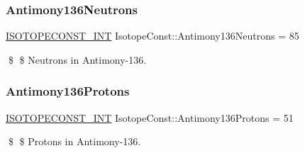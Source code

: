 \subsubsection{\texorpdfstring{Antimony136\+Neutrons}{Antimony136Neutrons}}
{\footnotesize\ttfamily \mbox{\hyperlink{group___isotope_const-_macros_ga5f18360b3e99483a35c32d789e62621c}{I\+S\+O\+T\+O\+P\+E\+C\+O\+N\+S\+T\+\_\+\+I\+NT}} Isotope\+Const\+::\+Antimony136\+Neutrons = 85}

\$ \$ Neutrons in Antimony-\/136. \mbox{\label{group___isotope_const-_antimony-_sb136_ga7e2d01a9c7a07191fd17c2b88f96b98c}} 
\subsubsection{\texorpdfstring{Antimony136\+Protons}{Antimony136Protons}}
{\footnotesize\ttfamily \mbox{\hyperlink{group___isotope_const-_macros_ga5f18360b3e99483a35c32d789e62621c}{I\+S\+O\+T\+O\+P\+E\+C\+O\+N\+S\+T\+\_\+\+I\+NT}} Isotope\+Const\+::\+Antimony136\+Protons = 51}

\$ \$ Protons in Antimony-\/136. 